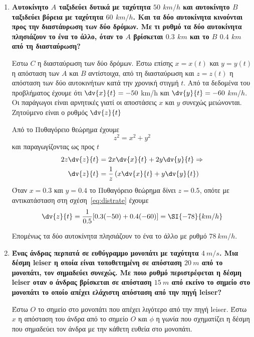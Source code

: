 \begin{enumerate}
  \item  {\bfseries \boldmath Αυτοκίνητο $A$ ταξιδεύει δυτικά με ταχύτητα $50$
      $\si{km\per h}$ και αυτοκίνητο $B$ ταξιδεύει βόρεια με ταχύτητα $60$
      $\si{km/h}$. Και τα δύο αυτοκίνητα κινούνται προς την διαστάυρωση των δύο δρόμων. 
      Με τι ρυθμό τα δύο αυτοκίνητα πλησιάζουν το ένα το άλλο, όταν το $A$ βρίσκεται 
    $0.3$ $\si{km}$ και το $B$ $0.4$ $\si{km}$ από τη διασταύρωση?}


    \vspace{\baselineskip}

    Εστω $C$ η διασταύρωση των δύο δρόμων. Έστω επίσης $x=x(t)$ και $y=y(t)$ η απόσταση 
    των $A$ και $B$ αντίστοιχα, από τη διασταύρωση  και $z=z(t)$ η απόσταση των δύο 
    αυτοκινήτων κατά την χρονική στιγμή $t$.
    Από τα δεδομένα του προβλήματος έχουμε ότι $\dv{x}{t}=-50$ \si{km/h} και
    $\dv{y}{t}=-60$ $\si{km/h}$. Οι παράγωγοι είναι αρνητικές γιατί οι αποστάσεις $x$ 
    και $y$ συνεχώς μειώνονται. Ζητούμενο είναι ο ρυθμός $\dv{z}{t}$

    Από το Πυθαγόρειο θεώρημα έχουμε
    \[
      z^{2}=x^{2}+y^{2}
    \]
    και παραγωγίζοντας ως προς $t$
    \begin{align} \label{eq:distrate}
      2z\dv{z}{t} &= 2x\dv{x}{t} + 2y\dv{y}{t} \notag \Rightarrow \\
      \dv{z}{t} &= \frac{1}{z}\left(x\dv{x}{t}+y\dv{y}{t}\right)
    \end{align}
    Όταν $x=0.3$ και $y=0.4$ το Πυθαγόρειο θεώρημα δίνει $z=0.5$, οπότε με αντικατάσταση 
    στη σχέση~\eqref{eq:distrate} έχουμε
    \[
      \dv{z}{t}=\frac{1}{0.5}[0.3(-50)+0.4(-60)] = \SI{-78}{km/h}
    \]

    Επομένως τα δύο αυτοκίνητα πλησιάζουν το ένα το άλλο με ρυθμό $\SI{78}{km/h}$.


  \item {\bfseries \boldmath Ένας άνδρας περπατά σε ευθύγραμμο μονοπάτι με
      ταχύτητα $\SI{4}{m/s}$. Μια δέσμη leiser η οποία είναι τοποθετημένη σε απόσταση 
      $\SI{20}{m}$ από το μονοπάτι, τον σημαδεύει συνεχώς. Με ποιο ρυθμό περιστρέφεται η 
      δέσμη leiser οταν ο άνδρας βρίσκεται σε απόσταση $\SI{15}{m}$ από εκείνο το σημείο 
    στο μονοπάτι το οποίο απέχει ελάχιστη απόσταση από την πηγή leiser?}


    \vspace{\baselineskip}
    Έστω $O$ το σημείο στο μονοπάτι που απέχει λιγότερο από την πηγή leiser.
    Έστω $x$ η απόσταση του άνδρα από το σημείο $O$ και $\phi$ η γωνία που σχηματίζει η 
    δέσμη που σημαδεύει τον άνδρα με την κάθετη ευθεία στο μονοπάτι.


\end{enumerate}
